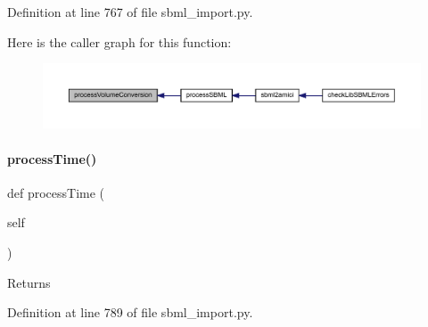 Definition at line 767 of file sbml\+\_\+import.\+py.

Here is the caller graph for this function\+:
\nopagebreak
\begin{figure}[H]
\begin{center}
\leavevmode
\includegraphics[width=350pt]{classamici_1_1sbml__import_1_1_sbml_importer_af2a2cbf8550d30fc0e95a875758b8262_icgraph}
\end{center}
\end{figure}
\mbox{\label{classamici_1_1sbml__import_1_1_sbml_importer_a2819c6ad1b541e49e728aa172e57208e}} 
\paragraph{\texorpdfstring{process\+Time()}{processTime()}}
{\footnotesize\ttfamily def process\+Time (\begin{DoxyParamCaption}\item[{}]{self }\end{DoxyParamCaption})}

\begin{DoxyReturn}{Returns}

\end{DoxyReturn}


Definition at line 789 of file sbml\+\_\+import.\+py.

